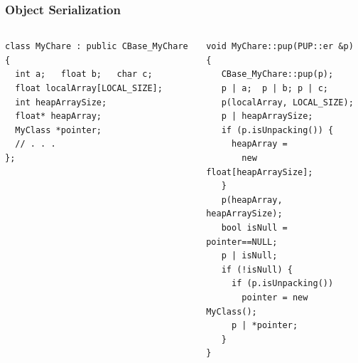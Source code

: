 \begin{frame}[fragile]
\frametitle{Object Serialization}
\begin{columns}
\begin{column}{0.5\textwidth}
\begin{lstlisting}
class MyChare : public CBase_MyChare {
  int a;   float b;   char c;
  float localArray[LOCAL_SIZE];
  int heapArraySize;
  float* heapArray;
  MyClass *pointer;
  // . . . 
};
\end{lstlisting}
\end{column}
\begin{column}{0.5\textwidth}
\begin{lstlisting}
void MyChare::pup(PUP::er &p) {
   CBase_MyChare::pup(p);
   p | a;  p | b; p | c;
   p(localArray, LOCAL_SIZE);
   p | heapArraySize;
   if (p.isUnpacking()) {
     heapArray =
       new float[heapArraySize];
   }
   p(heapArray, heapArraySize);
   bool isNull = pointer==NULL;
   p | isNull;
   if (!isNull) {
     if (p.isUnpacking())
       pointer = new MyClass();
     p | *pointer;
   }
}
\end{lstlisting}
\end{column}
\end{columns}
\end{frame}
